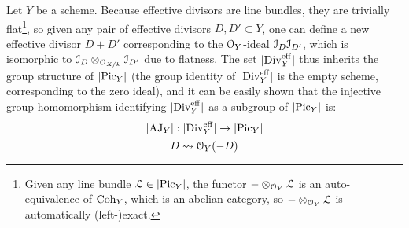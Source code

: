         \begin{remark} \label{remark: groups_of_effective_divisors}
            Let $Y$ be a scheme. Because effective divisors are line bundles, they are trivially flat\footnote{Given any line bundle $\mathcal{L} \in |\mathrm{Pic}_Y|$, the functor $- \otimes_{\mathcal{O}_Y} \mathcal{L}$ is an auto-equivalence of $\mathrm{Coh}_Y$, which is an abelian category, so $- \otimes_{\mathcal{O}_Y} \mathcal{L}$ is automatically (left-)exact.}, so given any pair of effective divisors $D, D' \subset Y$, one can define a new effective divisor $D + D'$ corresponding to the $\mathcal{O}_Y$-ideal $\mathcal{I}_D \mathcal{I}_{D'}$, which is isomorphic to $\mathcal{I}_D \otimes_{\mathcal{O}_{X/k}} \mathcal{I}_{D'}$ due to flatness. The set $|\mathrm{Div}_Y^{\mathrm{eff}}|$ thus inherits the group structure of $|\mathrm{Pic}_Y|$ (the group identity of $|\mathrm{Div}_Y^{\mathrm{eff}}|$ is the empty scheme, corresponding to the zero ideal), and it can be easily shown that the injective group homomorphism identifying $|\mathrm{Div}_Y^{\mathrm{eff}}|$ as a subgroup of $|\mathrm{Pic}_Y|$ is:
                $$|\mathrm{AJ}_Y|: |\mathrm{Div}_Y^{\mathrm{eff}}| \to |\mathrm{Pic}_Y|$$
                $$D \leadsto \mathcal{O}_Y(-D)$$
        \end{remark}
        
